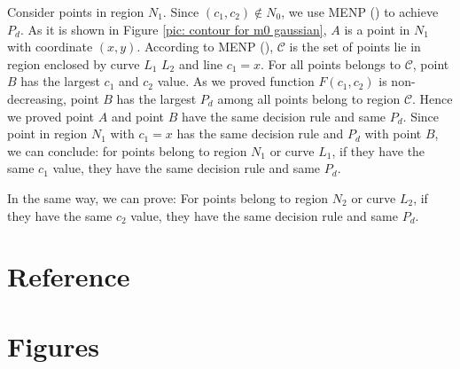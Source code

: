 \documentclass[12pt,journal,a4paper,twoside,doublecolumn]{IEEEtran}
\newcommand{\rmnum}[1]{\romannumeral #1}
\begin{document}
\begin{spacing}{1.0}
Consider points in region $N_1$. Since $(c_1, c_2) \notin N_0$, we use MENP (\rmnum{2}) to achieve $P_d$. As it is shown in Figure \ref{pic: contour for m0 gaussian}, $A$ is a point in $N_1$ with coordinate $(x, y)$. According to MENP (\rmnum{2}), $\mathcal{C}$ is the set of points lie in region enclosed by curve $L_1$ $L_2$ and line $c_1 = x$. For all points belongs to $\mathcal{C}$, point $B$ has the largest $c_1$ and $c_2$ value. As we proved function $F(c_1, c_2)$ is non-decreasing, point $B$ has the largest $P_d$ among all points belong to region $\mathcal{C}$. Hence we proved point $A$ and point $B$ have the same decision rule and same $P_d$. Since point in region $N_1$ with $c_1 = x$ has the same decision rule and $P_d$ with point $B$, we can conclude: for points belong to region $N_1$ or curve $L_1$, if they have the same $c_1$ value, they have the same decision rule and same $P_d$.

In the same way, we can prove: For points belong to region $N_2$ or curve $L_2$, if they have the same $c_2$ value, they have the same decision rule and same $P_d$.

\section{Reference}
\newpage

\section{Figures}
\newpage


\end{spacing}
\end{document}
